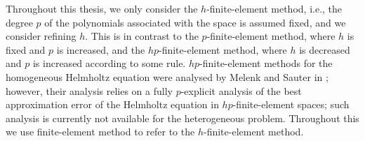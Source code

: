 


Throughout this thesis, we only consider the $h$-finite-element method, i.e., the degree $p$ of the polynomials associated with the space is assumed fixed, and we consider refining $h.$ This is in contrast to the $p$-finite-element method, where $h$ is fixed and $p$ is increased, and the $hp$-finite-element method, where $h$ is decreased and $p$ is increased according to some rule. $hp$-finite-element methods for the homogeneous Helmholtz equation were analysed by Melenk and Sauter in \cite{MeSa:10,MeSa:11}; however, their analysis relies on a fully $p$-explicit analysis of the best approximation error of the Helmholtz equation in $hp$-finite-element spaces; such analysis is currently not available for the heterogeneous problem. Throughout this  we use finite-element method to refer to the $h$-finite-element method.



